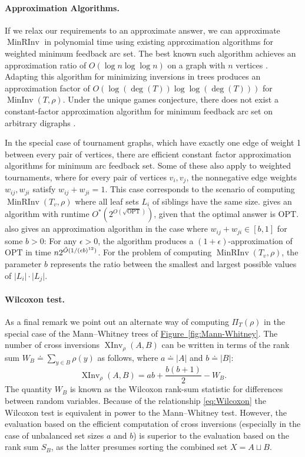 \documentclass[11pt]{article}
\numberwithin{equation}{section}
\theoremstyle{definition}
\theoremstyle{plain}
\newcommand{\expref}[2]{\hyperref[#2]{#1~\ref{#2}}}
\newcommand{\ranking}{\rho}
\DeclareMathOperator{\XInv}{XInv}
\DeclareMathOperator{\MInv}{MinInv}
\DeclareMathOperator{\MRInv}{MinRInv}
\begin{document}
\paragraph{Approximation Algorithms.} If we relax our requirements to an approximate answer, we can approximate $\MRInv$ in polynomial time using existing approximation algorithms for weighted minimum feedback arc set. The best known such algorithm achieves an approximation ratio of $O(\log n\log\log n)$ on a graph with $n$ vertices \cite{ENSS98}. Adapting this algorithm for minimizing inversions in trees produces an approximation factor of $O(\log (\deg(T)) \log\log (\deg(T)))$ for $\MInv(T,\ranking)$. Under the unique games conjecture, there does not exist a constant-factor approximation algorithm for minimum feedback arc set on arbitrary digraphs \cite{GHMRC11}.

In the special case of tournament graphs, which have exactly one edge of weight 1 between every pair of vertices, there are efficient constant factor approximation algorithms for minimum arc feedback set. Some of these also apply to weighted tournaments, where for every pair of vertices $v_i,v_j$, the nonnegative edge weights $w_{ij},w_{ji}$ satisfy $w_{ij}+w_{ji}=1$. This case corresponds to the scenario of computing $\MRInv(T_v,\ranking)$ where all leaf sets $L_i$ of siblings have the same size. \cite{KS10} gives an algorithm with runtime $O^*(2^{O(\sqrt{\mathrm{OPT}})})$, given that the optimal answer is $\mathrm{OPT}$. \cite{KMS07} also gives an approximation algorithm in the case where $w_{ij}+w_{ji}\in [b,1]$ for some $b>0$: For any $\epsilon>0$, the algorithm produces a $(1+\epsilon)$-approximation of $\mathrm{OPT}$ in time $n 2^{\Tilde{O}(1/(\epsilon b)^{12}) }$. For the problem of computing $\MRInv(T_v,\ranking)$, the parameter $b$ represents the ratio between the smallest and largest possible values of $\lvert L_i\rvert\cdot\lvert L_j\rvert$.

\paragraph{Wilcoxon test.} As a final remark we point out an alternate way of computing $\Pi_T(\ranking)$ in the special case of the Mann--Whitney trees of \expref{Figure}{fig:Mann-Whitney}. The number of cross inversions $\XInv_\ranking(A,B)$ can be written in terms of the rank sum $W_B \doteq \sum_{y \in B} \ranking(y)$ as follows, where $a \doteq |A|$ and $b \doteq |B|$:
\begin{equation}\label{eq:Wilcoxon}
\XInv_\ranking(A,B) = ab + \frac{b(b+1)}{2} - W_B.
\end{equation}
The quantity $W_B$ is known as the Wilcoxon rank-sum statistic for differences between random variables. Because of the relationship \eqref{eq:Wilcoxon} the Wilcoxon test is equivalent in power to the Mann--Whitney test. However, the evaluation based on the efficient computation of cross inversions (especially in the case of unbalanced set sizes $a$ and $b$) is superior to the evaluation based on the rank sum $S_B$, as the latter presumes sorting the combined set $X = A \sqcup B$.
\end{document}
